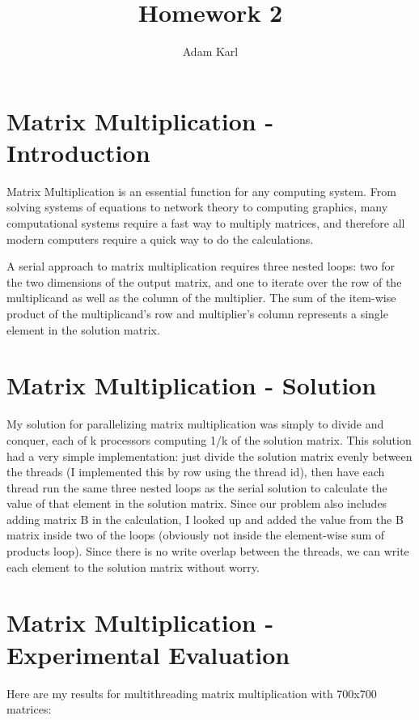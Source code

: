 \documentclass[a4paper]{article}
\title{Homework 2}
\author{Adam Karl}
\begin{document}
\maketitle

\section{Matrix Multiplication - Introduction}
Matrix Multiplication is an essential function for any computing system. From solving systems of equations to network theory to computing graphics, many computational systems require a fast way to multiply matrices, and therefore all modern computers require a quick way to do the calculations.


A serial approach to matrix multiplication requires three nested loops: two for the two dimensions of the output matrix, and one to iterate over the row of the multiplicand as well as the column of the multiplier. The sum of the item-wise product of the multiplicand's row and multiplier's column represents a single element in the solution matrix.

\section{Matrix Multiplication - Solution}

My solution for parallelizing matrix multiplication was simply to divide and conquer, each of k processors computing 1/k of the solution matrix. This solution had a very simple implementation: just divide the solution matrix evenly between the threads (I implemented this by row using the thread id), then have each thread run the same three nested loops as the serial solution to calculate the value of that element in the solution matrix. Since our problem also includes adding matrix B in the calculation, I looked up and added the value from the B matrix inside two of the loops (obviously not inside the element-wise sum of products loop). Since there is no write overlap between the threads, we can write each element to the solution matrix without worry.



\section{Matrix Multiplication - Experimental Evaluation}

Here are my results for multithreading matrix multiplication with 700x700 matrices:
\end{document}
